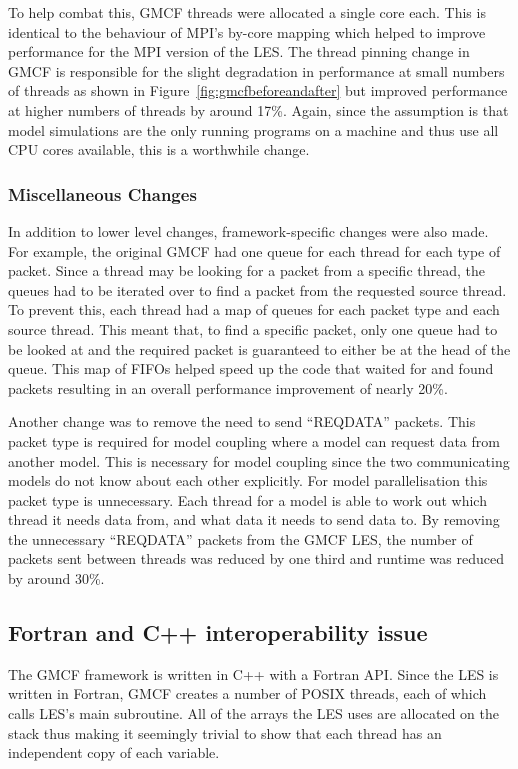 To help combat this, GMCF threads were allocated a single core each. This is
identical to the behaviour of MPI's by-core mapping which helped to improve
performance for the MPI version of the LES. The thread pinning change in GMCF is
responsible for the slight degradation in performance at small numbers of
threads as shown in Figure~\ref{fig:gmcfbeforeandafter} but improved performance
at higher numbers of threads by around 17\%. Again, since the assumption is that
model simulations are the only running programs on a machine and thus use all
CPU cores available, this is a worthwhile change.

\subsubsection{Miscellaneous Changes}

In addition to lower level changes, framework-specific changes were also made.
For example, the original GMCF had one queue for each thread for each type of
packet. Since a thread may be looking for a packet from a specific thread, the
queues had to be iterated over to find a packet from the requested source
thread. To prevent this, each thread had a map of queues for each packet type
and each source thread. This meant that, to find a specific packet, only one
queue had to be looked at and the required packet is guaranteed to either be at
the head of the queue. This map of FIFOs helped speed up the code that waited
for and found packets resulting in an overall performance improvement of nearly
20\%.

Another change was to remove the need to send ``REQDATA'' packets. This packet
type is required for model coupling where a model can request data from another
model. This is necessary for model coupling since the two communicating models
do not know about each other explicitly. For model parallelisation this packet
type is unnecessary. Each thread for a model is able to work out which thread it
needs data from, and what data it needs to send data to. By removing the
unnecessary ``REQDATA'' packets from the GMCF LES, the number of packets sent
between threads was reduced by one third and runtime was reduced by around 30\%.

\subsection{Fortran and C++ interoperability issue}
\label{sec:fortrancppinteroperability}

The GMCF framework is written in C++ with a Fortran API. Since the LES is
written in Fortran, GMCF creates a number of POSIX threads, each of which calls
LES's main subroutine. All of the arrays the LES uses are allocated on the stack
thus making it seemingly trivial to show that each thread has an independent
copy of each variable.

